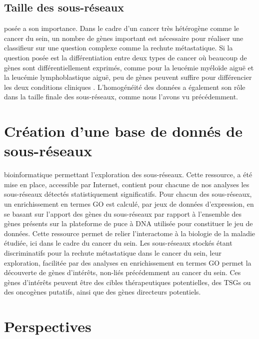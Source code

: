 		\subsection{\textcolor{blue!45!black}{Taille des sous-réseaux}}
			 posée a son importance.
			Dans le cadre d'un cancer très hétérogène comme le cancer du sein, un nombre de gènes important est nécessaire pour réaliser une classifieur sur une question complexe comme la rechute métastatique.
			Si la question posée est la différentiation entre deux types de cancer où beaucoup de gènes sont différentiellement exprimés, comme pour la leucémie myéloïde aiguë et la leucémie lymphoblastique aiguë, peu de gènes peuvent suffire pour différencier les deux conditions cliniques \citet{Dobbin2008}.
			L'homogénéité des données a également son rôle dans la taille finale des sous-réseaux, comme nous l'avons vu précédemment.

	\section{\textcolor{blue!45!black}{Création d'une base de donnés de sous-réseaux}}
			 bioinformatique permettant l'exploration des sous-réseaux.
			Cette ressource, a été mise en place, accessible par Internet, contient pour chacune de nos analyses les sous-réseaux détectés statistiquement significatifs.
			Pour chacun des sous-réseaux, un enrichissement en termes \acs{GO} est calculé, par jeux de données d'expression, en se basant sur l'apport des gènes du sous-réseaux par rapport à l'ensemble des gènes présents sur la plateforme de puce à \acs{DNA} utilisée pour constituer le jeu de données.
			Cette ressource permet de relier l'interactome à la biologie de la maladie étudiée, ici dans le cadre du cancer du sein.
			Les sous-réseaux stockés étant discriminatifs pour la rechute métastatique dans le cancer du sein, leur exploration, facilitée par des analyses en enrichissement en termes \acs{GO} permet la découverte de gènes d'intérêts, non-liés précédemment au cancer du sein.
			Ces gènes d'intérêts peuvent être des cibles thérapeutiques potentielles, des \acsp{TSG} ou des oncogènes putatifs, ainsi que des gènes directeurs potentiels.
			
	\section{\textcolor{blue!45!black}{Perspectives}}
